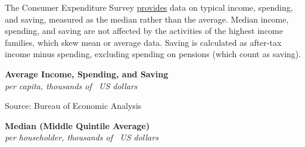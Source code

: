 \documentclass{report}
\makeatletter
\newcommand{\tbllink}[1]{\href{https://raw.githubusercontent.com/bdecon/US-chartbook/master/chartbook/data/#1}{\faTable}}
\newcommand*\short[1]{\expandafter\@gobbletwo\number\numexpr#1\relax}
\newcommand{\absnode}[3]{\node[below right, align=left] at (axis cs: #1,#2) {#3};}
\newcommand{\shdateaxisticks}{
		date coordinates in=x, axis line style={draw=none},
		xmax={2022-10-31},
		max space between ticks=40,	    
		xtick={{1990-01-01}, {1995-01-01}, {2000-01-01}, 
			{2005-01-01}, {2010-01-01}, {2015-01-01}, {2020-01-01}},
		minor xtick={},
		enlarge y limits={0.06}, enlarge x limits={0.01},
		}
\newcommand{\bbar}[2]{extra #1 ticks = {{#2}}, extra #1 tick labels = ,
		extra #1 tick style = {grid=major, grid style={thick, black!25}},}
\newcommand{\stdline}[4]{\addplot[very thick, no markers, color=#1] 
		table [x=#2, y=#3, col sep=comma] {#4};	}
\newcommand{\rbars}{
		\fill[color=black!10] (axis cs:{1990-07-01},\pgfkeysvalueof{/pgfplots/ymin}) rectangle 
			(axis cs:{1991-03-01}, \pgfkeysvalueof{/pgfplots/ymax});
		\fill[color=black!10] (axis cs:{2007-12-01},\pgfkeysvalueof{/pgfplots/ymin}) rectangle 
			(axis cs:{2009-07-01}, \pgfkeysvalueof{/pgfplots/ymax});
		\fill[color=black!10] (axis cs:{2001-03-01},\pgfkeysvalueof{/pgfplots/ymin}) rectangle 
			(axis cs:{2001-11-01}, \pgfkeysvalueof{/pgfplots/ymax});
		\fill[color=black!10] (axis cs:{2020-02-01},\pgfkeysvalueof{/pgfplots/ymin}) rectangle 
			(axis cs:{2020-05-01}, \pgfkeysvalueof{/pgfplots/ymax});}
\makeatother
\begin{document}
{\begin{minipage}{0.76\textwidth}


The Consumer Expenditure Survey \href{https://www.bls.gov/cex/tables.htm}{provides} data on typical income, spending, and saving, measured as the median rather than the average. Median income, spending, and saving are not affected by the activities of the highest income families, which skew mean or average data. Saving is calculated as after-tax income minus spending, excluding spending on pensions (which count as saving). 
\end{minipage}
\vspace{2mm}

\begin{minipage}{0.43\textwidth}
\normalsize \textbf{Average Income, Spending, and Saving}\\
\footnotesize{\textit{per capita, thousands of \unskip \ US dollars}}
\vspace{4.8cm}

\hspace{4mm} 

\footnotesize{Source: Bureau of Economic Analysis} \hfill \tbllink{inc_out_save.csv}
\end{minipage} \hspace{8mm}
\begin{minipage}{0.43\textwidth}
\normalsize \textbf{Median (Middle Quintile Average)}\\
\footnotesize{\textit{per householder, thousands of \unskip \ US dollars}}
\vspace{4.8cm}


\end{minipage}}
\end{document}
